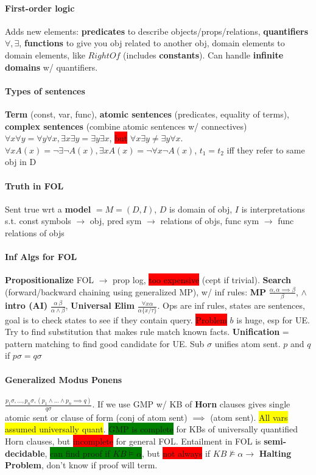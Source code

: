 \paragraph{First-order logic} Adds new elements: \textbf{predicates}
to describe objects/props/relations, \textbf{quantifiers} $\forall,\exists$, \textbf{functions} to give you obj related to another obj,
domain elements to domain elements, like $RightOf$ (includes \textbf{constants}). Can handle
\textbf{infinite domains} w/ quantifiers.
\paragraph{Types of sentences} \textbf{Term} (const, var, func),
\textbf{atomic sentences} (predicates, equality of terms),
\textbf{complex sentences} (combine atomic sentences w/ connectives)
\\ $\forall x \forall y = \forall y \forall x, \exists x \exists y =
\exists y \exists x$, \colorbox{red}{but} $\forall x \exists y \neq
\exists y \forall x$. $\forall x A(x)= \neg \exists \neg A(x), \exists
x A(x) = \neg \forall x \neg A(x)$, $t_1=t_2$ iff they refer to same
obj in D
\paragraph{Truth in FOL} Sent true wrt a \textbf{model} $=
M=(D,I)$, $D$ is domain of obj, $I$ is interpretations
s.t. const symbols $\to$ obj, pred sym $\to$ relations of objs, func
sym $\to$ func relations of objs
\paragraph{Inf Algs for FOL} \textbf{Propositionalize} FOL $\to$ prop
log, \colorbox{red}{too expensive} (cept if trivial). \textbf{Search} (forward/backward chaining using generalized
MP), w/ inf rules:
\textbf{MP} $\frac{\alpha, \alpha \implies \beta}{\beta}$,
\textbf{$\land$ intro (AI)} $\frac{\alpha \  \beta}{\alpha \land \beta}$,
\textbf{Universal Elim} $\frac{\forall x \alpha}{\alpha\{x/\tau\}}$. Ops
are inf rules, states are sentences, goal is to check states to see if
they contain query. \colorbox{red}{Problem} $b$ is huge, esp for
UE. Try to find substitution that makes rule match known
facts. \textbf{Unification} = pattern matching to find good candidate
for UE. Sub $\sigma$ unifies atom sent. $p$ and $q$ if $p\sigma =
q\sigma$
\paragraph{Generalized Modus Ponens} $\frac{p_1\sigma, \ldots,
  p_n\sigma, (p_1 \land \ldots \land p_n \implies q)}{q\sigma}$. If we
use GMP w/ KB of \textbf{Horn} clauses gives single atomic sent or
clause of form (conj of atom sent) $\implies$ (atom sent). \colorbox{yellow}{All vars
  assumed universally quant}. \colorbox{green}{GMP is
  complete} for KBs of universally quantified Horn clauses, but
\colorbox{red}{incomplete} for general FOL. Entailment in FOL is
\textbf{semi-decidable}, \colorbox{green}{can find proof if $KB
  \models \alpha$}, but \colorbox{red}{not always} if $KB \nvDash
\alpha \to$ \textbf{Halting Problem}, don't know if proof will term.
